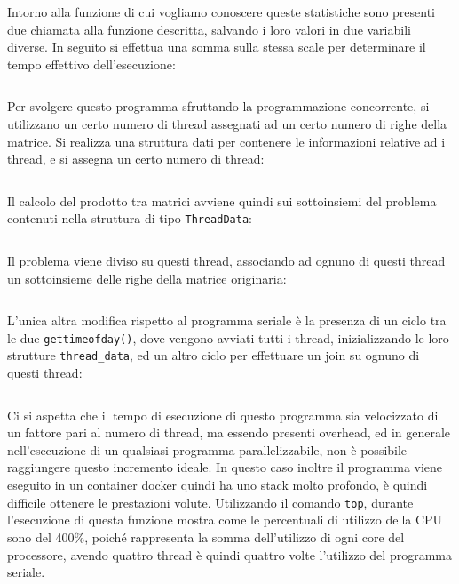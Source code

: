 \documentclass{article}
\numberwithin{equation}{subsection}
\begin{document}
Intorno alla funzione di cui vogliamo conoscere queste statistiche sono presenti 
due chiamata alla funzione descritta, salvando i loro valori in due variabili diverse. 
In seguito si effettua una somma sulla stessa scale per determinare il tempo effettivo 
dell'esecuzione:
\inputminted[firstline=26, lastline=42]{c}{./Programmazione Concorrente/single.c}


Per svolgere questo programma sfruttando la 
programmazione concorrente, si utilizzano un certo numero di thread assegnati ad un certo numero di righe della matrice. 
Si realizza una struttura dati per contenere le informazioni relative ad i thread, e 
si assegna un certo numero di thread:
\inputminted[firstline=1, lastline=19]{c}{./Programmazione Concorrente/multi.c}

Il calcolo del prodotto tra matrici avviene quindi sui sottoinsiemi del problema 
contenuti nella struttura di tipo \verb|ThreadData|: 
\inputminted[firstline=27, lastline=36]{c}{./Programmazione Concorrente/multi.c}

Il problema viene diviso su questi thread, associando ad ognuno di questi thread un 
sottoinsieme delle righe della matrice originaria: 
\inputminted[firstline=42, lastline=44]{c}{./Programmazione Concorrente/multi.c}

L'unica altra modifica rispetto al programma seriale è la presenza di un ciclo 
tra le due \verb|gettimeofday()|, dove vengono avviati tutti i thread, inizializzando 
le loro strutture \verb|thread_data|, ed un altro ciclo per effettuare un join su 
ognuno di questi thread:
\inputminted[firstline=50, lastline=63,breaklines, breakanywhere]{c}{./Programmazione Concorrente/multi.c}



Ci si aspetta che il tempo di esecuzione 
di questo programma sia velocizzato di un fattore pari al numero di thread, ma essendo presenti overhead, ed in generale nell'esecuzione di 
un qualsiasi programma parallelizzabile, non è possibile raggiungere questo incremento ideale. 
In questo caso inoltre il programma viene eseguito in un container docker quindi ha uno stack molto profondo, è quindi difficile ottenere le prestazioni volute. Utilizzando il comando \verb|top|, durante l'esecuzione di questa funzione mostra come le percentuali di utilizzo della CPU 
sono del 400\%, poiché rappresenta la somma dell'utilizzo di ogni core del processore, avendo 
quattro thread è quindi quattro volte l'utilizzo del programma seriale. 
\end{document}
